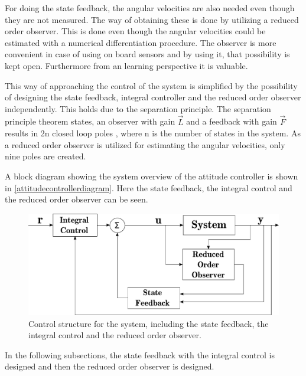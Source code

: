 For doing the state feedback, the angular velocities are also needed even though they are not measured. The way of obtaining these is done by utilizing a reduced order observer. This is done even though the angular velocities could be estimated with a numerical differentiation procedure. The observer is more convenient in case of using on board sensors and by using it, that possibility is kept open. Furthermore from an learning perspective it is valuable.

This way of approaching the control of the system is simplified by the possibility of designing the state feedback, integral controller and the reduced order observer independently. This holds due to the separation principle.
The separation principle theorem states, an observer with gain $\vec{L}$ and a feedback with gain $\vec{F}$ results in 2n closed loop poles \cite{ObserverChristoffer}, where n is the number of states in the system. As a reduced order observer is utilized for estimating the angular velocities, only nine poles are created. 

A block diagram showing the system overview of the attitude controller is shown in \autoref{attitudecontrollerdiagram}. Here the state feedback, the integral control and the reduced order observer can be seen.
\begin{figure}[H]
	\includegraphics[scale=.5]{figures/AttitudeControlDiagram}
	\centering
	\caption{Control structure for the system, including the state feedback, the integral control and the reduced order observer.}
	\label{attitudecontrollerdiagram}
\end{figure}

In the following subsections, the state feedback with the integral control is designed and then the reduced order observer is designed.

%
%